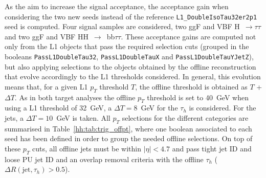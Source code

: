 \documentclass[../main.tex]{subfiles}
\begin{document}
As the aim to increase the signal acceptance, the acceptance gain when considering the two new seeds instead of the reference \texttt{L1\_Double\-IsoTau32\-er2p1} seed is computed. Four signal samples are considered, two ggF and VBF H~$\to\tau\tau$ and two ggF and VBF HH~$\to$~bb$\tau\tau$. These acceptance gains are computed not only from the L1 objects that pass the required selection cuts (grouped in the booleans \texttt{PassL1DoubleTau32}, \texttt{PassL1DoubleTauX} and \texttt{PassL1DoubleTauYJetZ}), but also applying selections to the objects obtained by the offline reconstruction that evolve accordingly to the L1 thresholds considered. In general, this evolution means that, for a given L1 $p_T$ threshold $T$, the offline threshold is obtained as $T$ + $\Delta T$. As in both target analyses the offline \tauh{} $p_T$ threshold is set to 40~GeV when using a L1 threshold of 32~GeV, a $\Delta T=8$~GeV for the $\tau_h$ is considered. For the jets, a $\Delta T=10$~GeV is taken. All $p_T$ selections for the different categories are summarised in Table~\ref{hh:tab:trig_offpt}, where one boolean associated to each seed has been defined in order to group the needed offline selections. On top of these $p_T$ cuts, all offline jets must be within $|\eta|<4.7$ and pass tight jet ID and loose PU jet ID and an overlap removal criteria with the offline $\tau_h$ ($\Delta R(\text{jet}, \tau_h)>0.5$). 
\end{document}
